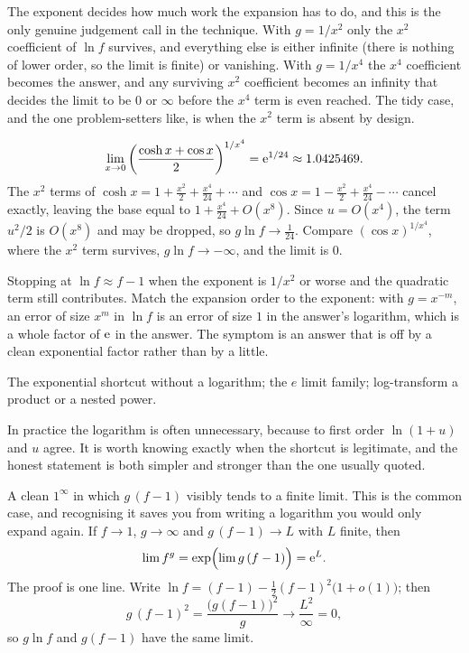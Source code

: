 The exponent decides how much work the expansion has to do, and this is the only genuine judgement call in the technique. With $g=1/x^{2}$ only the $x^{2}$ coefficient of $\ln f$ survives, and everything else is either infinite (there is nothing of lower order, so the limit is finite) or vanishing. With $g=1/x^{4}$ the $x^{4}$ coefficient becomes the answer, and any surviving $x^{2}$ coefficient becomes an infinity that decides the limit to be $0$ or $\infty$ before the $x^{4}$ term is even reached. The tidy case, and the one problem-setters like, is when the $x^{2}$ term is absent by design.

\begin{keynote}
\[\lim_{x\to0}\left(\frac{\cosh x+\cos x}{2}\right)^{1/x^{4}}=\mathrm{e}^{1/24}\approx1.0425469 .\]
The $x^{2}$ terms of $\cosh x=1+\tfrac{x^{2}}{2}+\tfrac{x^{4}}{24}+\cdots$ and $\cos x=1-\tfrac{x^{2}}{2}+\tfrac{x^{4}}{24}-\cdots$ cancel exactly, leaving the base equal to $1+\tfrac{x^{4}}{24}+O(x^{8})$. Since $u=O(x^{4})$, the term $u^{2}/2$ is $O(x^{8})$ and may be dropped, so $g\ln f\to\tfrac1{24}$. Compare $(\cos x)^{1/x^{4}}$, where the $x^{2}$ term survives, $g\ln f\to-\infty$, and the limit is $0$.
\end{keynote}

\begin{trap}
Stopping at $\ln f\approx f-1$ when the exponent is $1/x^{2}$ or worse and the quadratic term still contributes. Match the expansion order to the exponent: with $g=x^{-m}$, an error of size $x^{m}$ in $\ln f$ is an error of size $1$ in the answer's logarithm, which is a whole factor of $\mathrm{e}$ in the answer. The symptom is an answer that is off by a clean exponential factor rather than by a little.
\end{trap}

\begin{seealsob}The exponential shortcut without a logarithm; the $e$ limit family; log-transform a product or a nested power.\end{seealsob}

In practice the logarithm is often unnecessary, because to first order $\ln(1+u)$ and $u$ agree. It is worth knowing exactly when the shortcut is legitimate, and the honest statement is both simpler and stronger than the one usually quoted.

\cue A clean $1^{\infty}$ in which $g\,(f-1)$ visibly tends to a finite limit. This is the common case, and recognising it saves you from writing a logarithm you would only expand again.
\method If $f\to1$, $g\to\infty$ and $g\,(f-1)\to L$ with $L$ finite, then
\[\lim f^{g}=\exp\Bigl(\lim g\,(f-1)\Bigr)=\mathrm{e}^{L}.\]
The proof is one line. Write $\ln f=(f-1)-\tfrac12(f-1)^{2}\bigl(1+o(1)\bigr)$; then
\[g\,(f-1)^{2}=\frac{\bigl(g(f-1)\bigr)^{2}}{g}\longrightarrow\frac{L^{2}}{\infty}=0,\]
so $g\ln f$ and $g(f-1)$ have the same limit.

